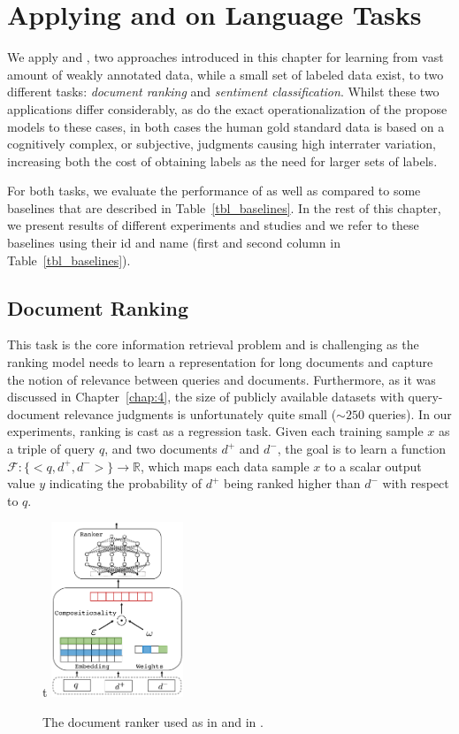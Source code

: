 \section{Applying \cws and \fwl on Language Tasks}
We apply \cws and \fwl, two approaches introduced in this chapter for learning from vast amount of weakly annotated data, while a small set of labeled data exist, to two different tasks: \emph{document ranking} and \emph{sentiment classification}. 
Whilst these two applications differ considerably, as do the exact operationalization of the propose models to these cases, in both cases the human gold standard data is based on a cognitively complex, or subjective, judgments causing high interrater variation, increasing both the cost of obtaining labels as the need for larger sets of labels.


For both tasks, we evaluate the performance of \cws as well as \fwl compared to some baselines that are described in Table~\ref{tbl_baselines}. In the rest of this chapter, we present results of different experiments and studies and we refer to these baselines using their id and name (first and second column in Table~\ref{tbl_baselines}).

\subsection{Document Ranking}
This task is the core information retrieval problem and is challenging as the ranking model needs to learn a representation for long documents and capture the notion of relevance between queries and documents. Furthermore, as it was discussed in Chapter~\ref{chap:4}, the size of publicly available datasets with query-document relevance judgments is unfortunately quite small ($\sim 250$ queries).
%
In our experiments, ranking is cast as a regression task. Given each training sample $x$ as a triple of query $q$, and two documents $d^+$ and $d^-$, the goal is to learn a function $\mathcal{F} : \{<q, d^+, d^->\} \rightarrow \mathbb{R}$, which maps each data sample $x$ to a scalar output value $y$ indicating the probability of $d^+$ being ranked higher than $d^-$ with respect to $q$. 

\begin{figure}{t}
    \centering
            \includegraphics[width=0.35\textwidth]{03-part-02/chapter-05/figs_and_tables/fig_ranker.pdf}
    \caption{The document ranker used as \tch in \cws and \std in \fwl.}
    \label{fig:ranker}
\end{figure}


